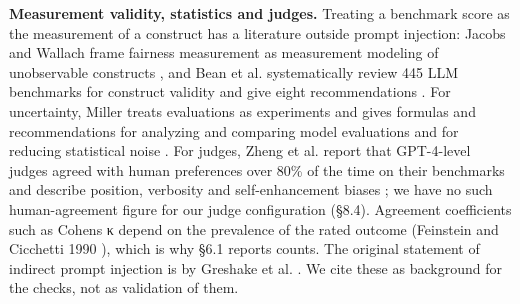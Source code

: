 \documentclass[10pt]{article}
\begin{document}
\textbf{Measurement validity, statistics and judges.} Treating a benchmark score as the measurement of a construct has a literature outside prompt injection: Jacobs and Wallach frame fairness measurement as measurement modeling of unobservable constructs \cite{arxiv1912_05511}, and Bean et al. systematically review 445 LLM benchmarks for construct validity and give eight recommendations \cite{arxiv2511_04703}. For uncertainty, Miller treats evaluations as experiments and gives formulas and recommendations for analyzing and comparing model evaluations and for reducing statistical noise \cite{arxiv2411_00640}. For judges, Zheng et al. report that GPT-4-level judges agreed with human preferences over 80\% of the time on their benchmarks and describe position, verbosity and self-enhancement biases \cite{arxiv2306_05685}; we have no such human-agreement figure for our judge configuration (§8.4). Agreement coefficients such as Cohen\textquotesingle s κ depend on the prevalence of the rated outcome (Feinstein and Cicchetti 1990 \cite{FC1990}), which is why §6.1 reports counts. The original statement of indirect prompt injection is by Greshake et al. \cite{arxiv2302_12173}. We cite these as background for the checks, not as validation of them.
\end{document}
